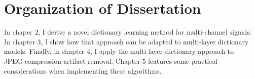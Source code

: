 \section{Organization of Dissertation}
In chaper $2$, I derive a novel dictionary learning method for multi-channel signals. In chapter $3$, I show how that approach can be adapted to multi-layer dictionary models.  Finally, in chapter $4$, I apply the multi-layer dictionary approach to JPEG compression artifact removal. Chapter $5$ features some practical considerations when implementing these algorithms.





